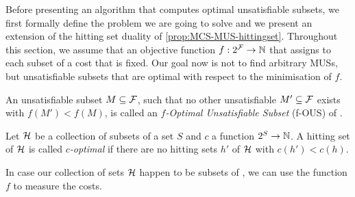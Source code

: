 
Before presenting an algorithm that computes optimal unsatisfiable subsets, we first formally define the problem we are going to solve and we present an extension of the hitting set duality of \cref{prop:MCS-MUS-hittingset}. 
Throughout this section, we assume that an objective function $f: 2^{\mathcal{F}}  \to \mathbb{N}$ that assigns to each subset of \formula a cost that is fixed. Our goal now is not to find arbitrary MUSs, but unsatisfiable subsets that are optimal with respect to the minimisation of $f$. 



\begin{definition}
  An unsatisfiable subset $M\subseteq \mathcal{F} $, such that no other unsatisfiable $M'\subseteq \mathcal{F} $ exists with $f(M')<f(M)$, is called an \emph{$f$-Optimal Unsatisfiable Subset} (f-OUS) of \formula.
\end{definition}

\begin{definition}
  Let $\mathcal{H}$ be a collection of subsets of a set $S$ and $c$ a function $2^S\to\mathbb{N}$. 
  A hitting set of $\mathcal{H}$ is called \emph{$c$-optimal} if there are no hitting sets $h'$ of $\mathcal{H}$ with $c(h')<c(h)$. 
\end{definition}
In case our collection of sets $\mathcal{H}$ happen to be subsets of \formula, we can use the function $f$ to measure the costs. 
% 


